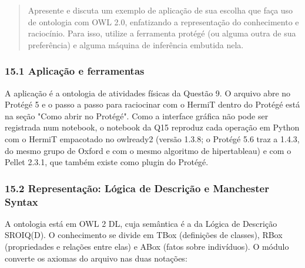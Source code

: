 \documentclass[12pt, a4paper]{article}
\DeclareRobustCommand{\texttt}[1]{\breakabletexttt{#1}}
\begin{document}
\begin{quote}
Apresente e discuta um exemplo de aplicação de sua escolha que faça uso de ontologia com OWL 2.0, enfatizando a representação do conhecimento e raciocínio. Para isso, utilize a ferramenta protégé (ou alguma outra de sua preferência) e alguma máquina de inferência embutida nela.
\end{quote}

\subsubsection{15.1 Aplicação e ferramentas}\label{151-aplicauxe7uxe3o-e-ferramentas}

A aplicação é a ontologia de atividades físicas da Questão 9. O arquivo \texttt{.owl} abre no Protégé 5 e o passo a passo para raciocinar com o HermiT dentro do Protégé está na seção "Como abrir no Protégé". Como a interface gráfica não pode ser registrada num notebook, o notebook da Q15 reproduz cada operação em Python com o HermiT empacotado no owlready2 (versão 1.3.8; o Protégé 5.6 traz a 1.4.3, do mesmo grupo de Oxford e com o mesmo algoritmo de hipertableau) e com o Pellet 2.3.1, que também existe como plugin do Protégé.

\subsubsection{15.2 Representação: Lógica de Descrição e Manchester Syntax}\label{152-representauxe7uxe3o-luxf3gica-de-descriuxe7uxe3o-e-manchester-syntax}

A ontologia está em OWL 2 DL, cuja semântica é a da Lógica de Descrição SROIQ(D). O conhecimento se divide em TBox (definições de classes), RBox (propriedades e relações entre elas) e ABox (fatos sobre indivíduos). O módulo \texttt{sintaxe\_owl.py} converte os axiomas do arquivo nas duas notações:
\end{document}

